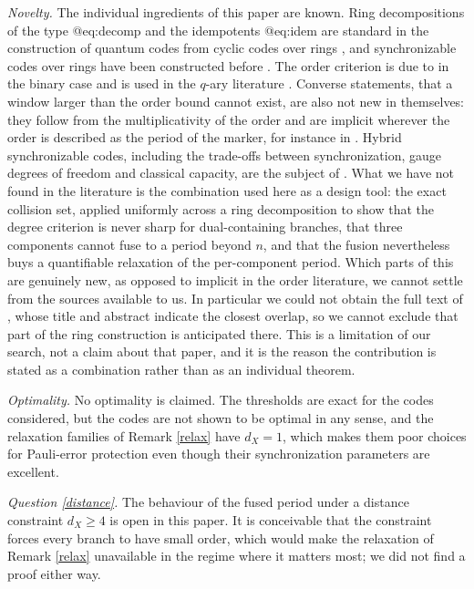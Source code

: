 \documentclass[11pt,reqno]{amsart}
\theoremstyle{definition}
\theoremstyle{remark}
\begin{document}
\emph{Novelty.} The individual ingredients of this paper are known. Ring decompositions of the type @eq:decomp and the idempotents @eq:idem are standard in the construction of quantum codes from cyclic codes over rings \cite{DinhEtAl2021,DinhBagUpadhyay2021}, and synchronizable codes over rings have been constructed before \cite{LiuLiu2021,DaiLiu2022,LiuHuLiu2024}. The order criterion is due to \cite{FujiwaraTonchevWong2013} in the binary case and is used in the $q$-ary literature \cite{XieYangYuan2016,LuoMa2018}. Converse statements, that a window larger than the order bound cannot exist, are also not new in themselves: they follow from the multiplicativity of the order and are implicit wherever the order is described as the period of the marker, for instance in \cite{FujiwaraTonchevWong2013}. Hybrid synchronizable codes, including the trade-offs between synchronization, gauge degrees of freedom and classical capacity, are the subject of \cite{TansuwannontNemec2026}. What we have not found in the literature is the combination used here as a design tool: the exact collision set, applied uniformly across a ring decomposition to show that the degree criterion is never sharp for dual-containing branches, that three components cannot fuse to a period beyond $n$, and that the fusion nevertheless buys a quantifiable relaxation of the per-component period. Which parts of this are genuinely new, as opposed to implicit in the order literature, we cannot settle from the sources available to us. In particular we could not obtain the full text of \cite{LiZhu2022}, whose title and abstract indicate the closest overlap, so we cannot exclude that part of the ring construction is anticipated there. This is a limitation of our search, not a claim about that paper, and it is the reason the contribution is stated as a combination rather than as an individual theorem.


\emph{Optimality.} No optimality is claimed. The thresholds are exact for the codes considered, but the codes are not shown to be optimal in any sense, and the relaxation families of Remark \ref{relax} have $d_X=1$, which makes them poor choices for Pauli-error protection even though their synchronization parameters are excellent.


\emph{Question \ref{distance}.} The behaviour of the fused period under a distance constraint $d_X\ge4$ is open in this paper. It is conceivable that the constraint forces every branch to have small order, which would make the relaxation of Remark \ref{relax} unavailable in the regime where it matters most; we did not find a proof either way.
\end{document}
